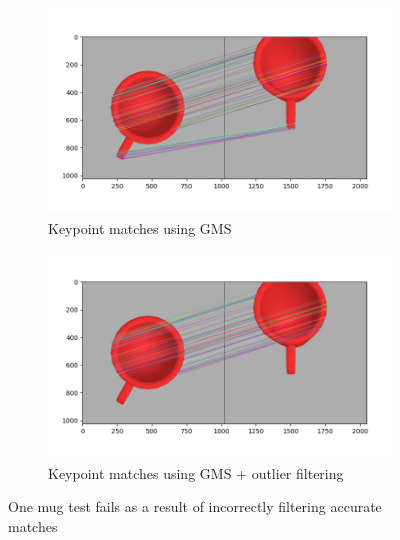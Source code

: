 \begin{figure}[h]
    \centering
    \begin{subfigure}[t]{0.49\textwidth}
        \includegraphics[width=\textwidth]{figures/mugGood.png}
        \caption{Keypoint matches using GMS}
        \label{fig:no-filter}
    \end{subfigure}
    \hfill
    \begin{subfigure}[t]{0.49\textwidth}
        \includegraphics[width=\textwidth]{figures/mugBad.png}
        \caption{Keypoint matches using GMS + outlier filtering}
        \label{fig:filter}
    \end{subfigure}
    \caption{One mug test fails as a result of incorrectly filtering accurate matches}
    \label{fig:bad-filtering}
\end{figure}

